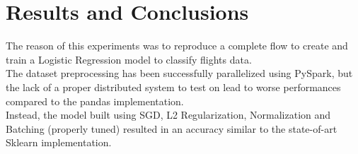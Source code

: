 \documentclass[
	letterpaper, %
	10pt, %
]{class}
\begin{document}

\section{Results and Conclusions}

The reason of this experiments was to reproduce a complete flow to create and train a Logistic Regression model to classify flights data.\\
The dataset preprocessing has been successfully parallelized using PySpark, but the lack of a proper distributed system to test on lead to worse performances compared to the pandas implementation.\\
Instead, the model built using SGD, L2 Regularization, Normalization and Batching (properly tuned) resulted in an accuracy similar to the state-of-art Sklearn implementation.


\printbibliography %


\end{document}

